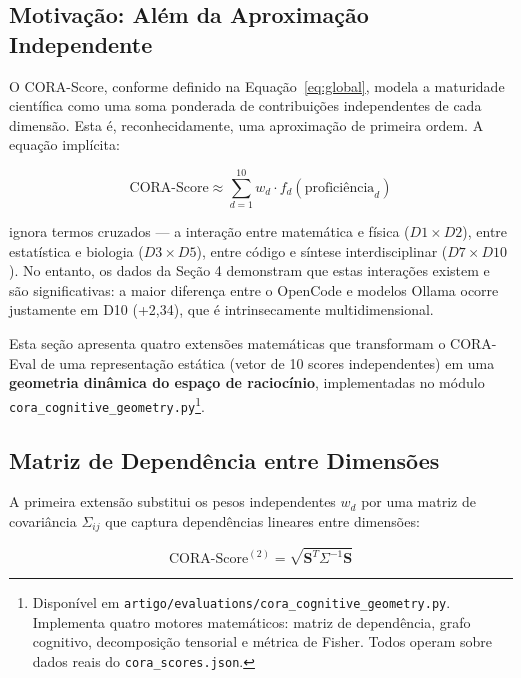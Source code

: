 ﻿%


\subsection{Motivação: Além da Aproximação Independente}

O CORA-Score, conforme definido na Equação~\ref{eq:global}, modela a
maturidade científica como uma soma ponderada de contribuições independentes
de cada dimensão. Esta é, reconhecidamente, uma aproximação de primeira ordem.
A equação implícita:

\begin{equation}\label{eq:indep}
\text{CORA-Score} \approx \sum_{d=1}^{10} w_d \cdot f_d(\text{proficiência}_d)
\end{equation}

ignora termos cruzados — a interação entre matemática e física ($D1 \times D2$),
entre estatística e biologia ($D3 \times D5$), entre código e síntese
interdisciplinar ($D7 \times D10$). No entanto, os dados da Seção 4 demonstram
que estas interações existem e são significativas: a maior diferença entre o
OpenCode e modelos Ollama ocorre justamente em D10 (+2,34), que é
intrinsecamente multidimensional.

Esta seção apresenta quatro extensões matemáticas que transformam o CORA-Eval
de uma representação estática (vetor de 10 scores independentes) em uma
\textbf{geometria dinâmica do espaço de raciocínio}, implementadas no módulo
\texttt{cora\_cognitive\_geometry.py}\footnote{Disponível em
\texttt{artigo/evaluations/cora\_cognitive\_geometry.py}. Implementa quatro
motores matemáticos: matriz de dependência, grafo cognitivo, decomposição
tensorial e métrica de Fisher. Todos operam sobre dados reais do
\texttt{cora\_scores.json}.}.

\subsection{Matriz de Dependência entre Dimensões}

A primeira extensão substitui os pesos independentes $w_d$ por uma matriz de
covariância $\Sigma_{ij}$ que captura dependências lineares entre dimensões:

\begin{equation}\label{eq:mahalanobis}
\text{CORA-Score}^{(2)} = \sqrt{\mathbf{S}^T \Sigma^{-1} \mathbf{S}}
\end{equation}


